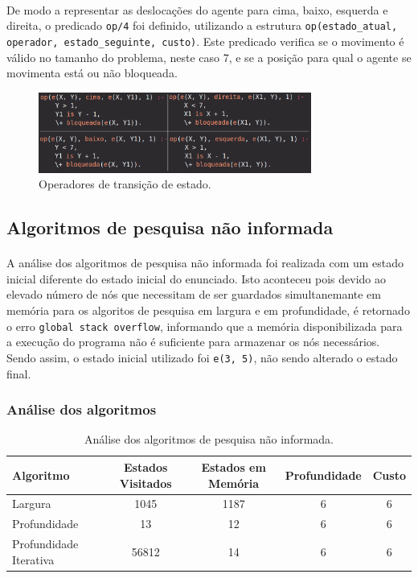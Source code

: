 \documentclass{article}
\begin{document}
\paragraph{} De modo a representar as deslocações do agente para cima, baixo, esquerda e direita, o predicado \texttt{op/4} foi definido, utilizando a estrutura \texttt{op(estado\_atual, operador, estado\_seguinte, custo)}. Este predicado verifica se o movimento é válido no tamanho do problema, neste caso 7, e se a posição para qual o agente se movimenta está ou não bloqueada.

\begin{figure}[h]
\centering
\includegraphics[width=0.8\textwidth]{operadores.png}
\caption{\label{fig:op}Operadores de transição de estado.}
\end{figure}

\subsection{Algoritmos de pesquisa não informada}
\paragraph{} A análise dos algoritmos de pesquisa não informada foi realizada com um estado inicial diferente do estado inicial do enunciado. Isto aconteceu pois devido ao elevado número de nós que necessitam de ser guardados simultanemante em memória para os algoritos de pesquisa em largura e em profundidade, é retornado o erro \texttt{global stack overflow}, informando que a memória disponibilizada para a execução do programa não é suficiente para armazenar os nós necessários. Sendo assim, o estado inicial utilizado foi \texttt{e(3, 5)}, não sendo alterado o estado final.
\subsubsection{Análise dos algoritmos}
\begin{table}[h]
\centering
\begin{tabular}{l|c|c|c|c}
Algoritmo & Estados Visitados & Estados em Memória & Profundidade & Custo \\\hline
Largura & 1045 & 1187 & 6 & 6 \\\hline
Profundidade & 13 & 12 & 6 & 6 \\\hline
Profundidade Iterativa & 56812 & 14 & 6 & 6 
\end{tabular}
\caption{\label{tab:pni}Análise dos algoritmos de pesquisa não informada.}
\end{table}
\end{document}
